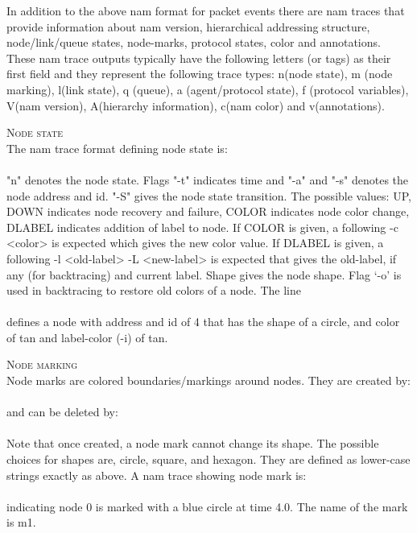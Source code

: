In addition to the above nam format for packet events there are nam traces
that provide information about nam version, hierarchical
addressing structure, node/link/queue states, node-marks, protocol states,
color and annotations. These nam trace outputs typically have the
following letters (or tags) as their first field and they represent the
following trace types: 
n(node state), m (node marking), l(link state), q (queue), a 
(agent/protocol state), f (protocol variables),
V(nam version), A(hierarchy information), c(nam color) and v(annotations).

\textsc{Node state}\\
The nam trace format defining node state is:\\
\\
"n" denotes the node state. Flags "-t" indicates time and "-a" and "-s"
denotes the node address and id. "-S" gives the node state transition.
The possible values: UP, DOWN indicates node recovery and
failure, COLOR indicates node color change, DLABEL indicates addition of
label to node. If COLOR is given, a following
-c <color> is expected which gives the new color value. If DLABEL is
given, a following -l <old-label> -L <new-label> is expected that gives
the old-label, if any (for backtracing) and current label. Shape gives
the node shape. Flag `-o'
is used in backtracing to restore old colors of a node. The line\\
\\
defines a node with address and id of 4 that has the shape of a
circle, and color of tan and label-color (-i) of tan.

\textsc{Node marking}\\
Node marks are colored boundaries/markings around nodes. They are created
by:\\
\\
and can be deleted by:\\
\\
Note that once created, a node mark cannot change its shape. The possible
choices for shapes are, circle, square, and hexagon. They are defined as 
lower-case strings exactly as above. A nam trace showing node mark is:\\
\\
indicating node 0 is marked with a blue circle at time 4.0. The name of
the mark is m1.


